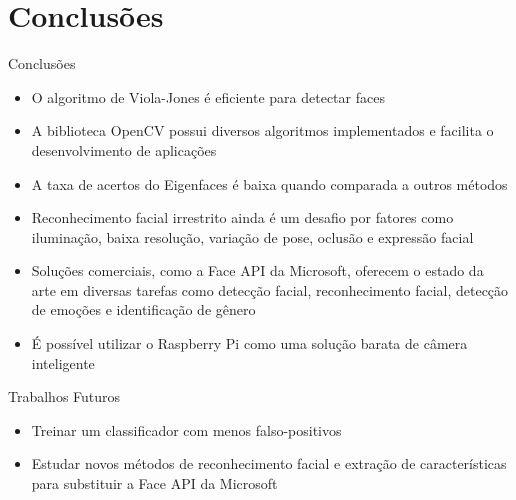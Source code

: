 \section{Conclusões}

\begin{frame}{Conclusões}
\begin{itemize}
    \item O algoritmo de Viola-Jones é eficiente para detectar faces
    \item A biblioteca OpenCV possui diversos algoritmos implementados e facilita o desenvolvimento de aplicações
    \item A taxa de acertos do Eigenfaces é baixa quando comparada a outros métodos
    \item Reconhecimento facial irrestrito ainda é um desafio por fatores como iluminação, baixa resolução, variação de pose, oclusão e expressão facial
    \item Soluções comerciais, como a Face API da Microsoft, oferecem o estado da arte em diversas tarefas como detecção facial, reconhecimento facial, detecção de emoções e identificação de gênero
    \item É possível utilizar o Raspberry Pi como uma solução barata de câmera inteligente
\end{itemize}
\end{frame}


\begin{frame}{Trabalhos Futuros}
\begin{itemize}
    \item Treinar um classificador com menos falso-positivos
    \item Estudar novos métodos de reconhecimento facial e extração de características para substituir a Face API da Microsoft
\end{itemize}
\end{frame}


